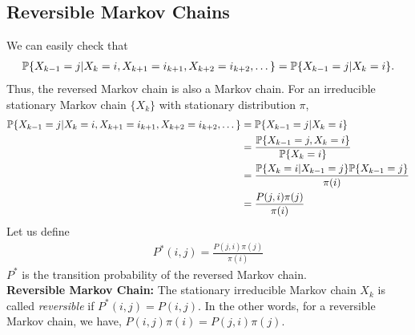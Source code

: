 \documentclass[all-lectures.tex]{subfiles}
\begin{document}
\subsection{Reversible Markov Chains}
We can easily check that 
\begin{align*}
\P\{X_{k-1} = j| X_k = i, X_{k+1} = i_{k+1}, X_{k+2} = i_{k+2}, \dots\} = \P\{X_{k-1} = j|X_k = i\}.
\end{align*}
Thus, the reversed Markov chain is also a Markov chain. For an irreducible  stationary Markov chain $\{X_k\}$ with stationary distribution $\pi$,
\begin{align*}
\P\{X_{k-1} = j| X_k = i,X_{k+1} = i_{k+1},X_{k+2} = i_{k+2},\dots\} &= \P\{X_{k-1} = j| X_k = i\} \\
&=  \frac{\P\{X_{k-1} = j, X_k = i\}}{\P\{ X_k = i\}} \\
&=  \frac{\P\{ X_k = i|X_{k-1} = j\}\P\{ X_{k-1} = j\}}{\pi(i)} \\
&=  \frac{P(j,i)\pi(j)}{\pi(i)}
\end{align*}
Let us define 
\begin{align*}
P^*(i,j)=\frac{P(j,i)\pi(j)}{\pi(i)}
\end{align*}
$P^*$ is the transition probability of the reversed Markov chain. \\
\indent \textbf{Reversible Markov Chain:} The stationary irreducible Markov chain $X_k$ is called \textit{reversible }if $P^*(i,j) = P(i,j)$. In the other words, for a reversible  Markov chain, we have, $P(i,j)\pi(i) = P(j,i)\pi(j)$.
\end{document}
